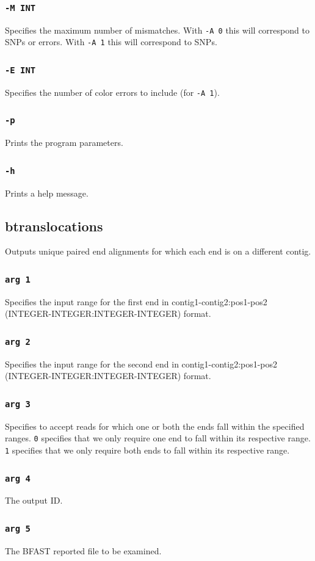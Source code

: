 \documentclass[a4paper,12pt]{book}
\newcommand{\TT}[1]{{\tt #1}} %
\newcommand{\BRF}{BFAST reported file} %
\begin{document}
\subsubsection{\TT{-M INT}}
Specifies the maximum number of mismatches.
With \TT{-A 0} this will correspond to SNPs or errors.
With \TT{-A 1} this will correspond to SNPs.
\subsubsection{\TT{-E INT}}
Specifies the number of color errors to include (for \TT{-A 1}).
\subsubsection{\TT{-p}}
Prints the program parameters.
\subsubsection{\TT{-h}}
Prints a help message.
\subsection{btranslocations}
\label{sec:btranslocations}
Outputs unique paired end alignments for which each end is on a different contig.
\subsubsection{\TT{arg 1}}
Specifies the input range for the first end in contig1-contig2:pos1-pos2 (INTEGER-INTEGER:INTEGER-INTEGER) format.
\subsubsection{\TT{arg 2}}
Specifies the input range for the second end in contig1-contig2:pos1-pos2 (INTEGER-INTEGER:INTEGER-INTEGER) format.
\subsubsection{\TT{arg 3}}
Specifies to accept reads for which one or both the ends fall within the specified ranges.
\TT{0} specifies that we only require one end to fall within its respective range.
\TT{1} specifies that we only require both ends to fall within its respective range.
\subsubsection{\TT{arg 4}}
The output ID.
\subsubsection{\TT{arg 5}}
The \BRF{} to be examined.
\end{document}

